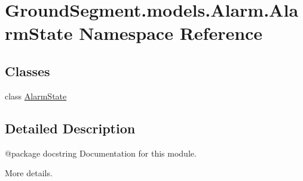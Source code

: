 \hypertarget{namespace_ground_segment_1_1models_1_1_alarm_1_1_alarm_state}{}\section{Ground\+Segment.\+models.\+Alarm.\+Alarm\+State Namespace Reference}
\label{namespace_ground_segment_1_1models_1_1_alarm_1_1_alarm_state}
\subsection*{Classes}
\begin{DoxyCompactItemize}
\item 
class \hyperlink{class_ground_segment_1_1models_1_1_alarm_1_1_alarm_state_1_1_alarm_state}{Alarm\+State}
\end{DoxyCompactItemize}


\subsection{Detailed Description}
\begin{DoxyVerb}@package docstring
Documentation for this module.

More details.
\end{DoxyVerb}
 